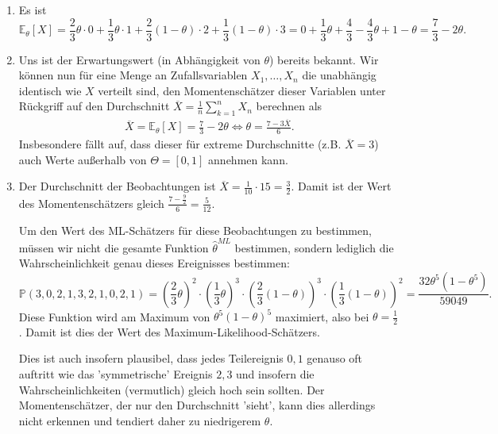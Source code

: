 \documentclass[a4paper]{article}
\begin{document}
\begin{enumerate}
    \item Es ist 
    \begin{equation*}
        \mathds{E}_\theta[X] = \frac{2}{3} \theta \cdot 0 + \frac{1}{3} \theta \cdot 1 + \frac{2}{3} ( 1- \theta) \cdot 2 + \frac{1}{3} (1-\theta) \cdot 3 = 0 + \frac{1}{3} \theta + \frac{4}{3} - \frac{4}{3} \theta + 1 - \theta = \frac{7}{3} - 2 \theta\text{.}
    \end{equation*}
    \item Uns ist der Erwartungswert (in Abhängigkeit von $\theta$) bereits bekannt.
    Wir können nun für eine Menge an Zufallsvariablen $X_1, \dots, X_n$ die unabhängig identisch wie $X$ verteilt sind, den Momentenschätzer dieser Variablen unter Rückgriff auf den Durchschnitt $\overline{X} = \frac{1}{n}\sum_{k = 1}^{n} X_n$ berechnen als
    \begin{align*}
        \overline{X} = \mathds{E}_\theta[X] = \frac{7}{3} - 2 \theta \iff \theta = \frac{7 - 3 \overline{X}}{6}\text{.}
    \end{align*}
    Insbesondere fällt auf, dass dieser für extreme Durchschnitte (z.B. $\overline{X} = 3$) auch Werte außerhalb von $\Theta = [0,1]$ annehmen kann.
    \item Der Durchschnitt der Beobachtungen ist $\overline{X} = \frac{1}{10} \cdot 15 = \frac{3}{2}$. Damit ist der Wert des Momentenschätzers gleich $\frac{7 - \frac{9}{2}}{6} = \frac{5}{12}$.
    
    Um den Wert des ML-Schätzers für diese Beobachtungen zu bestimmen, müssen wir nicht die gesamte Funktion $\hat{\theta}^{ML}$ bestimmen, sondern lediglich die Wahrscheinlichkeit genau dieses Ereignisses bestimmen:
    \begin{equation*}
        \mathds{P}(3,0,2,1,3,2,1,0,2,1) = \left(\frac{2}{3}\theta\right)^2 \cdot \left(\frac{1}{3} \theta\right)^3 \cdot \left(\frac{2}{3}(1-\theta)\right)^3 \cdot \left(\frac{1}{3}(1-\theta)\right)^2 = \frac{32 \theta^5 (1-\theta^5)}{59049}\text{.}
    \end{equation*}
    Diese Funktion wird am Maximum von $\theta^5 (1-\theta)^5$ maximiert, also bei $\theta = \frac{1}{2}$.
    Damit ist dies der Wert des Maximum-Likelihood-Schätzers.

    Dies ist auch insofern plausibel, dass jedes Teilereignis $0,1$ genauso oft auftritt wie das 'symmetrische' Ereignis $2,3$ und insofern die Wahrscheinlichkeiten (vermutlich) gleich hoch sein sollten.
    Der Momentenschätzer, der nur den Durchschnitt 'sieht', kann dies allerdings nicht erkennen und tendiert daher zu niedrigerem $\theta$.
\end{enumerate} 
\end{document}
